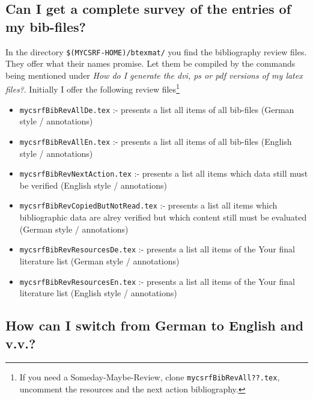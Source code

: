 \documentclass[
  DIV=calc,
  BCOR=5mm,
  11pt,
  headings=small,
  oneside,
  abstract=true,
  toc=bib,
  ngerman,english]{scrartcl}
\begin{document}
\subsection{Can I get a complete survey of the entries of my bib-files?}
In the directory \texttt{\$(MYCSRF-HOME)/btexmat/} you find the bibliography
review files. They offer what their names promise. Let them be compiled by the
commands being mentioned under \textit{How do I generate the dvi, ps or pdf
versions of my latex files?}. Initially I offer the following review
files\footnote{If you need a Someday-Maybe-Review, clone
\texttt{mycsrfBibRevAll??.tex}, uncomment the resources and the next action
bibliography.}

\begin{itemize}
  \item \texttt{mycsrfBibRevAllDe.tex} :- presents a list all items of all
  bib-files (German style / annotations)
  \item \texttt{mycsrfBibRevAllEn.tex} :- presents a list all items of all
  bib-files (English style / annotations)
  \item \texttt{mycsrfBibRevNextAction.tex} :- presents a list all items 
  which data still must be verified (English style / annotations)
  \item \texttt{mycsrfBibRevCopiedButNotRead.tex} :- presents a list all items 
  which bibliographic data are alrey verified but which content still
  must be evaluated (German style / annotations)
  \item \texttt{mycsrfBibRevResourcesDe.tex} :- presents a list all items of
  the Your final literature list (German style / annotations)
  \item \texttt{mycsrfBibRevResourcesEn.tex} :- presents a list all items of
  the Your final literature list (English style / annotations)
\end{itemize}

\subsection{How can I switch from German to English and v.v.?}
\end{document}
